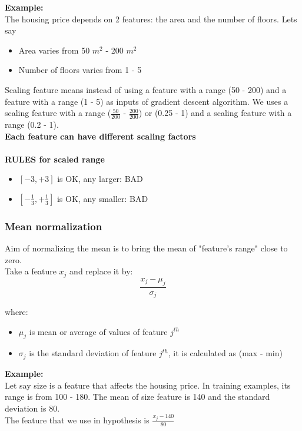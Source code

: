 \textbf{Example:} \\
The housing price depends on 2 features: the area and the number of floors. Lets say 
\begin{itemize}
	\item Area varies from 50 $m^2$ - 200 $m^2$
	\item Number of floors varies from 1 - 5
\end{itemize}

Scaling feature means instead of using a feature with a range (50 - 200) and a feature with a range (1 - 5) as inputs of gradient descent algorithm. We uses a scaling feature with a range ($\displaystyle\frac{50}{200}$ -  $\displaystyle\frac{200}{200}$) or (0.25 - 1) and  a scaling feature with a range (0.2 - 1). \\

\textbf{Each feature can have different scaling factors} \\ \\
\textbf{RULES for scaled range}
\begin{itemize}
	\item $\left[-3,  +3\right]$ is OK, any larger: BAD
	\item $\left[-\displaystyle\frac{1}{3}, +\displaystyle\frac{1}{3}\right]$ is OK, any smaller: BAD
\end{itemize}

\subsubsection{Mean normalization}
Aim of normalizing the mean is to bring the mean of "feature's range" close to zero. \\
Take a feature $x_j$ and replace it by:\\
\begin{equation*}
\frac{x_j - \mu_j}{\sigma_j}
\end{equation*}

where:
\begin{itemize}
	\item $\mu_j$ is mean or average of values of feature $j^{th}$
	\item $\sigma_j$ is the standard deviation of feature $j^{th}$, it is calculated as (max - min)
\end{itemize}

\textbf{Example:}\\
Let say size is a feature that affects the housing price. In training examples, its range is from 100 - 180. The mean of size feature is 140 and the standard deviation is 80. \\
The feature that we use in hypothesis is $\displaystyle\frac{x_j - 140}{80}$

